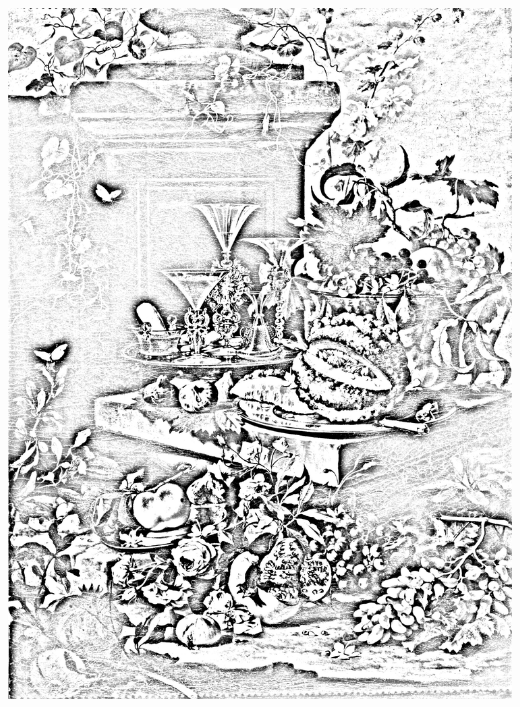\documentclass[hidelinks,12pt,a4paper]{article}
\begin{document}
\begin{adjustwidth}{-30mm}{-30mm}
			\thispagestyle{empty}
			\begin{minipage}{0.93\linewidth}
				\centering
				\includegraphics[scale=0.2]{Berentz_Christian-Fiori_e_frutta_con_bicchieri_di_cristallo.jpg}
			\end{minipage}
			
			\vspace*{\fill}
			\newpage
			

\end{adjustwidth}
\end{document}
